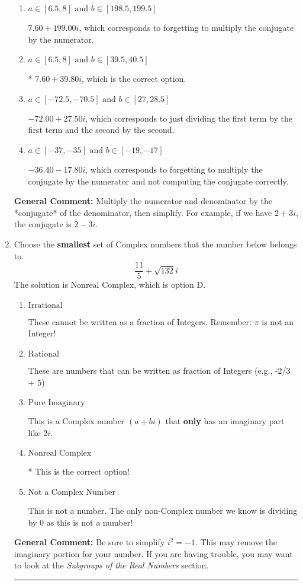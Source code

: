 \documentclass{extbook}[14pt]
\newcommand{\litem}[1]{\item #1

\rule{\textwidth}{0.4pt}}
\begin{document}
\begin{enumerate}
{\begin{enumerate}[label=\Alph*.]
 $38.00  + 39.80 i$, which corresponds to forgetting to multiply the conjugate by the numerator and using a plus instead of a minus in the denominator.
\item \( a \in [6.5, 8] \text{ and } b \in [198.5, 199.5] \)

 $7.60  + 199.00 i$, which corresponds to forgetting to multiply the conjugate by the numerator.
\item \( a \in [6.5, 8] \text{ and } b \in [39.5, 40.5] \)

* $7.60  + 39.80 i$, which is the correct option.
\item \( a \in [-72.5, -70.5] \text{ and } b \in [27, 28.5] \)

 $-72.00  + 27.50 i$, which corresponds to just dividing the first term by the first term and the second by the second.
\item \( a \in [-37, -35] \text{ and } b \in [-19, -17] \)

 $-36.40  - 17.80 i$, which corresponds to forgetting to multiply the conjugate by the numerator and not computing the conjugate correctly.
\end{enumerate}

\textbf{General Comment:} Multiply the numerator and denominator by the *conjugate* of the denominator, then simplify. For example, if we have $2+3i$, the conjugate is $2-3i$.
}
\litem{
Choose the \textbf{smallest} set of Complex numbers that the number below belongs to.
\[ \frac{11}{5}+\sqrt{132} i \]The solution is \( \text{Nonreal Complex} \), which is option D.\begin{enumerate}[label=\Alph*.]
\item \( \text{Irrational} \)

These cannot be written as a fraction of Integers. Remember: $\pi$ is not an Integer!
\item \( \text{Rational} \)

These are numbers that can be written as fraction of Integers (e.g., -2/3 + 5)
\item \( \text{Pure Imaginary} \)

This is a Complex number $(a+bi)$ that \textbf{only} has an imaginary part like $2i$.
\item \( \text{Nonreal Complex} \)

* This is the correct option!
\item \( \text{Not a Complex Number} \)

This is not a number. The only non-Complex number we know is dividing by 0 as this is not a number!
\end{enumerate}

\textbf{General Comment:} Be sure to simplify $i^2 = -1$. This may remove the imaginary portion for your number. If you are having trouble, you may want to look at the \textit{Subgroups of the Real Numbers} section.
}
\end{enumerate}
\end{document}
